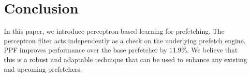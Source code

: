 \section{Conclusion}
\label{Conclusion}
In this paper, we introduce perceptron-based learning for prefetching. The
perceptron filter acts independently as a check on the underlying prefetch
engine. PPF improves performance over the base prefetcher by 11.9\%. We
believe that this is a robust and adaptable technique that can be used to
enhance any existing and upcoming prefetchers.
